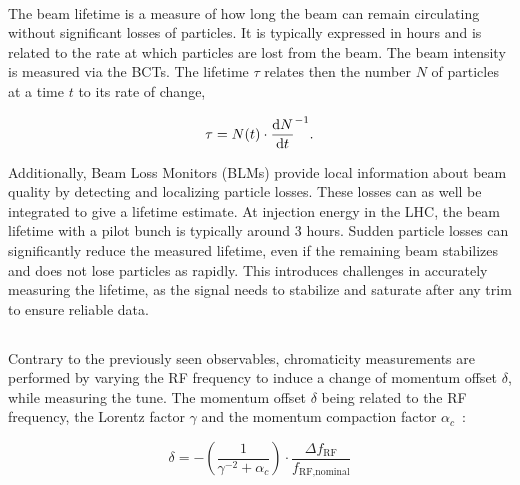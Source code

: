\paragraph{}

The beam lifetime is a measure of how long the beam can remain circulating without significant
losses of particles. It is typically expressed in hours and is related to the rate
at which particles are lost from the beam. The beam intensity is measured via the BCTs. The lifetime
$\tau$ relates then the number $N$ of particles at a time $t$ to its rate of change,

\begin{equation}
    \tau = N(t) \cdot \frac{\mathop{}\!\mathrm{d} N}{\mathop{}\!\mathrm{d} t}^{-1}.
\end{equation}

Additionally, Beam Loss Monitors (BLMs) provide local information about beam quality by detecting
and localizing particle losses. These losses can as well be integrated to give a lifetime estimate.
At injection energy in the LHC, the beam lifetime with a pilot bunch is typically around 3 hours.
Sudden particle losses can significantly reduce the measured lifetime, even if the remaining beam
stabilizes and does not lose particles as rapidly. This introduces challenges in accurately
measuring the lifetime, as the signal needs to stabilize and saturate after any trim to ensure
reliable data.


\subsection{}
\label{subsection:optics_corrections_chromaticity}


Contrary to the previously seen observables, chromaticity measurements are performed by varying
the RF frequency to induce a change of momentum offset $\delta$, while measuring the tune. The
momentum offset $\delta$ being related to the RF frequency, the Lorentz factor $\gamma$ and the
momentum compaction factor $\alpha_c$~\cite{keintzel_jacqueline_beam_2022}:

\begin{equation}
    \delta = - \left(\frac{1}{\gamma^{-2} + \alpha_c}\right) \cdot \frac{\Delta f_{\text{RF}}}{f_{\text{RF,nominal}}}
    \label{eq:dpp_rf}
\end{equation}

